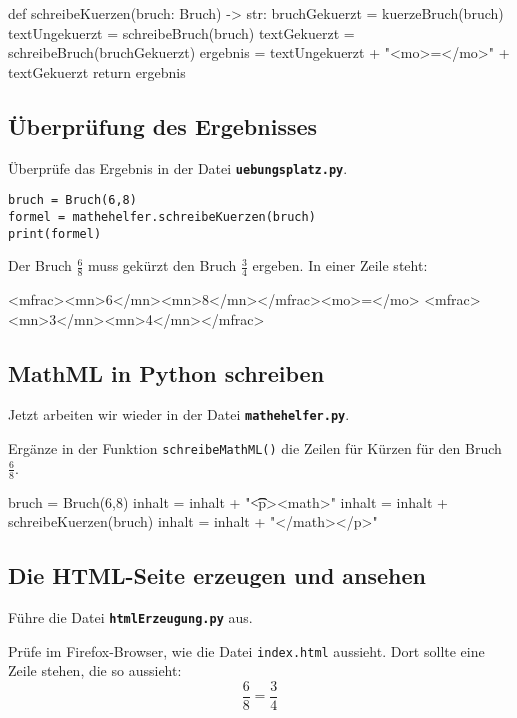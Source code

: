 \begin{codePython}
def schreibeKuerzen(bruch: Bruch) -> str:
	bruchGekuerzt = kuerzeBruch(bruch)
	textUngekuerzt = schreibeBruch(bruch)
	textGekuerzt = schreibeBruch(bruchGekuerzt)
	ergebnis = textUngekuerzt + "<mo>=</mo>" + textGekuerzt
	return ergebnis
\end{codePython}

\subsection*{Überprüfung des Ergebnisses}

Überprüfe das Ergebnis in der Datei \textbf{\texttt{uebungsplatz.py}}.

\lstset{style=syntaxPython}
\begin{lstlisting}
bruch = Bruch(6,8)
formel = mathehelfer.schreibeKuerzen(bruch)
print(formel)
\end{lstlisting}

Der Bruch $\frac{6}{8}$ muss gekürzt den Bruch $\frac{3}{4}$ ergeben. In einer Zeile steht:

\begin{codeHTML}
<mfrac><mn>6</mn><mn>8</mn></mfrac><mo>=</mo>
								<mfrac><mn>3</mn><mn>4</mn></mfrac>
\end{codeHTML}

\subsection*{MathML in Python schreiben}

Jetzt arbeiten wir wieder in der Datei \textbf{\texttt{mathehelfer.py}}.

Ergänze in der Funktion \texttt{schreibeMathML()} die Zeilen für Kürzen für den Bruch $\frac{6}{8}$.

\begin{codePython}
bruch = Bruch(6,8)
inhalt = inhalt + "\n\t\t<p><math>"
inhalt = inhalt + schreibeKuerzen(bruch)
inhalt = inhalt + "</math></p>"
\end{codePython}

\subsection*{Die HTML-Seite erzeugen und ansehen}

Führe die Datei \textbf{\texttt{htmlErzeugung.py}} aus.

Prüfe im Firefox-Browser, wie die Datei \texttt{index.html} aussieht. Dort sollte eine Zeile stehen, die so aussieht:
\[
\frac{6}{8} = \frac{3}{4}
\]
